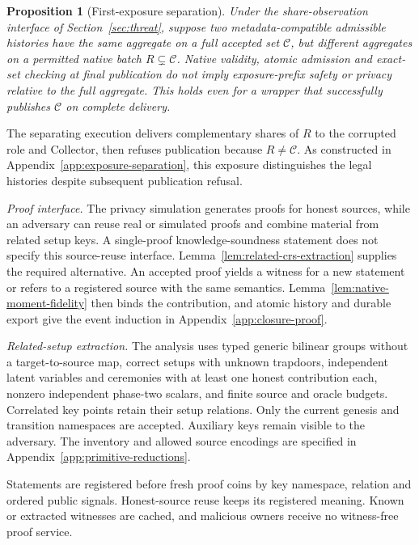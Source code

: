 \documentclass[conference,compsoc]{IEEEtran}
\theoremstyle{definition}
\numberwithin{equation}{section}
\numberwithin{table}{section}
\numberwithin{figure}{section}
\theoremstyle{plain}
\newtheorem{proposition}{Proposition}[section]
\newtheorem{proposition}{Proposition}
\begin{document}
\begin{proposition}[First-exposure separation]
\label{prop:exposure-separation}
Under the share-observation interface of Section~\ref{sec:threat}, suppose
two metadata-compatible admissible histories have the same aggregate
on a full accepted set \(\mathcal C\), but different aggregates on a permitted native
batch \(R\subsetneq\mathcal C\). Native validity, atomic admission and exact-set
checking at final publication do not imply exposure-prefix safety or privacy
relative to the full aggregate. This holds even for a wrapper that successfully
publishes \(\mathcal C\) on complete delivery.
\end{proposition}
The separating execution delivers complementary shares of \(R\) to the
corrupted role and Collector, then refuses publication because \(R\ne\mathcal C\).
As constructed in Appendix~\ref{app:exposure-separation}, this exposure distinguishes the legal histories despite subsequent publication refusal.

\par\noindent\emph{Proof interface.}
The privacy simulation generates proofs for honest sources, while an
adversary can reuse real or simulated proofs and combine material from
related setup keys. A single-proof knowledge-soundness statement does not
specify this source-reuse interface. Lemma~\ref{lem:related-crs-extraction}
supplies the required alternative. An accepted proof yields a witness for
a new statement or refers to a registered source with the same semantics.
Lemma~\ref{lem:native-moment-fidelity} then binds the contribution, and
atomic history and durable export give the event induction in
Appendix~\ref{app:closure-proof}.

\par\noindent\emph{Related-setup extraction.}
The analysis uses typed generic bilinear groups without a target-to-source
map, correct setups with unknown
trapdoors, independent latent variables and ceremonies with at least one
honest contribution each, nonzero independent phase-two scalars, and finite
source and oracle budgets. Correlated key points retain their setup
relations. Only the current genesis and transition namespaces are accepted.
Auxiliary keys remain visible to the adversary. The inventory and allowed
source encodings are specified in Appendix~\ref{app:primitive-reductions}.

Statements are registered before fresh proof coins by key namespace,
relation and ordered public signals. Honest-source reuse keeps its
registered meaning. Known or extracted witnesses are cached, and malicious
owners receive no witness-free proof service.
\end{document}
